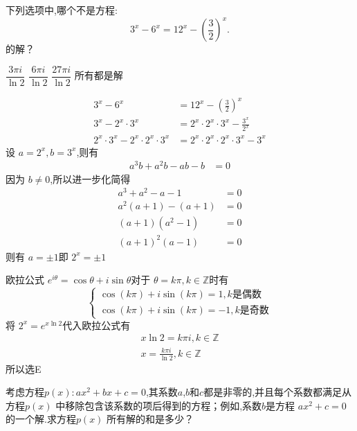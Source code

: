 \documentclass[answers]{exam}
\begin{document}
\begin{questions}
	\question 下列选项中,哪个不是方程:
	\begin{equation*}
		3^x - 6^x = 12^x - \left(\frac32\right)^x.
	\end{equation*}
	的解？

	\begin{oneparchoices}
		\choice \( \dfrac{3\pi i}{\ln2} \)
		\choice \( \dfrac{6\pi i}{\ln2} \)
		\choice \( \dfrac{27\pi i}{\ln2} \)
		\CorrectChoice 所有都是解
	\end{oneparchoices}

	\begin{solution}
		\begin{align*}
			3^x - 6^x                               & = 12^x - \left(\frac32\right)^x             \\
			3^x - 2^x \cdot 3^x                     & = 2^x \cdot 2^x \cdot 3^x - \frac{3^x}{2^x} \\
			2^x \cdot 3^x - 2^x \cdot 2^x \cdot 3^x & = 2^x \cdot 2^x \cdot 2^x \cdot 3^x - 3^x
		\end{align*}
		设 \( a = 2^x, b = 3^x \),则有
		\begin{align*}
			a^3b + a^2b - ab - b & = 0
		\end{align*}
		因为 \( b \ne 0 \),所以进一步化简得
		\begin{align*}
			a^3 + a^2 - a - 1 & = 0 \\
			a^2(a+1) - (a+1)  & = 0 \\
			(a+1)(a^2 - 1)    & = 0 \\
			(a+1)^2(a-1)      & = 0
		\end{align*}
		则有 \( a = \pm 1 \)即 \( 2^x = \pm 1 \)

		欧拉公式 \( e^{i\theta} = \cos\theta + i\sin\theta \)对于 \( \theta = k\pi, k \in \mathbb{Z}  \)时有
		\begin{equation*}
			\begin{cases}
				\cos(k\pi) + i\sin(k\pi) = 1, k \text{是偶数} \\
				\cos(k\pi) + i\sin(k\pi) = -1, k \text{是奇数}
			\end{cases}
		\end{equation*}
		将 \( 2^x = e^{x\ln2} \)代入欧拉公式有
		\begin{gather*}
			x \ln 2 = k\pi i,  k \in \mathbb{Z} \\
			x = \frac{k\pi i}{\ln2}, k \in \mathbb{Z}
		\end{gather*}
		所以选E
	\end{solution}

	\question 考虑方程$p(x): ax^2 + bx + c=0$,其系数$a$,$b$和$c$都是非零的,并且每个系数都满足从方程$p(x)$
	中移除包含该系数的项后得到的方程；例如,系数$b$是方程 $ax^2+c=0$的一个解.求方程$p(x)$
	所有解的和是多少？


\end{questions}
\end{document}
